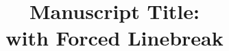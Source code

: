 \documentclass[amsmath, amssymb, aps] {revtex4-2}
\begin{document}

\title{Manuscript Title:\\with Forced Linebreak}%
\end{document}
